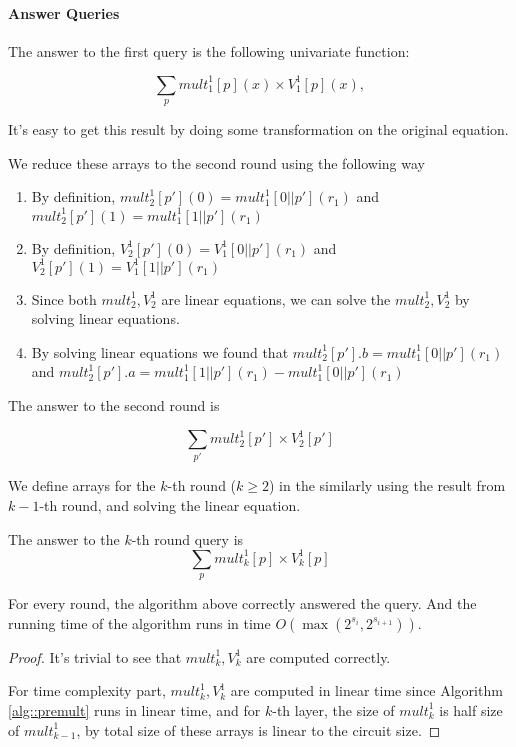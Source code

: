 {	\paragraph{Answer Queries}
	The answer to the first query is the following univariate function:
	
	$$\sum_{p}{mult}_1^1[p](x)\times{V}_1^1[p](x),$$
	
	It's easy to get this result by doing some transformation on the original equation.
	
	We reduce these arrays to the second round using the following way
	
	\begin{enumerate}
		\item By definition, ${mult}_2^1[p'](0)={mult}_1^1[0||p'](r_1)$ and ${mult}_2^1[p'](1)={mult}_1^1[1||p'](r_1)$
		\item By definition, ${V}_2^1[p'](0)={V}_1^1[0||p'](r_1)$ and ${V}_2^1[p'](1)={V}_1^1[1||p'](r_1)$
		
		\item Since both ${mult}_2^1, {V}_2^1$ are linear equations, we can solve the ${mult}_2^1, {V}_2^1$ by solving linear equations.
		\item By solving linear equations we found that ${mult}_2^1[p'].b={mult}_1^1[0||p'](r_1)$ and ${mult}_2^1[p'].a={mult}_1^1[1||p'](r_1)-{mult}_1^1[0||p'](r_1)$
	\end{enumerate}
	
	The answer to the second round is 
	
	$$\sum_{p'}{mult}_2^1[p']\times{V}_2^1[p']$$
	
	We define arrays for the $k$-th round ($k\ge 2$) in the similarly using the result from $k-1$-th round, and solving the linear equation.
	
	The answer to the $k$-th round query is 
	$$\sum_{p}{mult}_k^1[p]\times{V}_k^1[p]$$
	
	\begin{theorem} For every round, the algorithm above correctly answered the query. And the running time of the algorithm runs in time $O(\max(2^{s_i}, 2^{s_{i+1}}))$.
	\end{theorem}
	
	\begin{proof}
		It's trivial to see that ${mult}_k^1, {V}_k^1$ are computed correctly. 
		
		For time complexity part, ${mult}_k^1, {V}_k^1$ are computed in linear time since Algorithm \ref{alg::premult} runs in linear time, and for $k$-th layer, the size of ${mult}_k^1$ is half size of ${mult}_{k-1}^1$, by total size of these arrays is linear to the circuit size.
		

\end{proof}}
